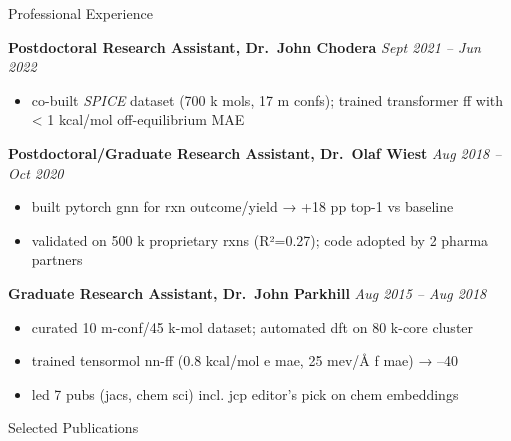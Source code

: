 \documentclass{resume} %
\begin{document}
\begin{rSection}{Professional Experience}

\textbf{Postdoctoral Research Assistant, Dr.\ John Chodera} \hfill \emph{Sept 2021 -- Jun 2022}
\vspace{-0.4em}
\begin{itemize}\itemsep -0.4em
  \item co-built \emph{SPICE} dataset (700 k mols, 17 m confs); trained transformer ff with < 1 kcal/mol off-equilibrium MAE
\end{itemize}

\textbf{Postdoctoral/Graduate Research Assistant, Dr.\ Olaf Wiest} \hfill \emph{Aug 2018 -- Oct 2020}
\vspace{-0.4em}
\begin{itemize}\itemsep -0.4em
  \item built pytorch gnn for rxn outcome/yield → +18 pp top-1 vs baseline
  \item validated on 500 k proprietary rxns (R²=0.27); code adopted by 2 pharma partners
\end{itemize}

\textbf{Graduate Research Assistant, Dr.\ John Parkhill} \hfill \emph{Aug 2015 -- Aug 2018}
\vspace{-0.4em}
\begin{itemize}\itemsep -0.4em
  \item curated 10 m-conf/45 k-mol dataset; automated dft on 80 k-core cluster
  \item trained tensormol nn-ff (0.8 kcal/mol e mae, 25 mev/Å f mae) → –40 %
  \item led 7 pubs (jacs, chem sci) incl. jcp editor’s pick on chem embeddings
\end{itemize}

\end{rSection}

\begin{rSection}{Selected Publications}

\item {}
\item {}
\item {}
\item {}

\end{rSection}

\clearpage
\end{document}
